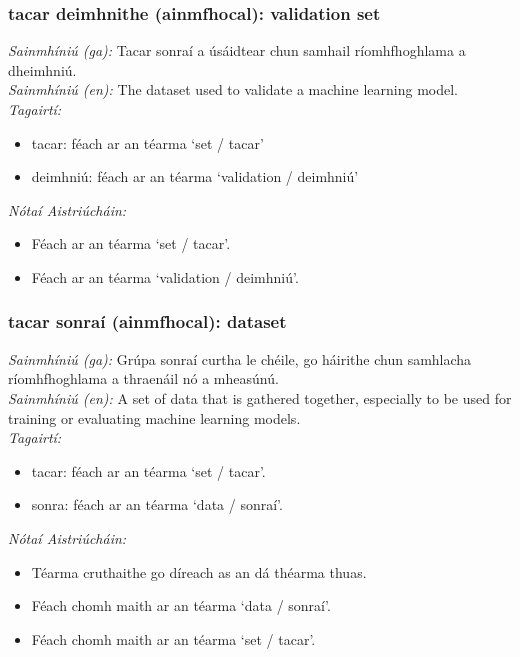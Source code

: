 \subsubsection*{tacar deimhnithe (ainmfhocal): validation set}
 \noindent \textit{Sainmhíniú (ga):} Tacar sonraí a úsáidtear chun samhail ríomhfhoghlama a dheimhniú.
\\
 \noindent \textit{Sainmhíniú (en):} The dataset used to validate a machine learning model.
\\
 \noindent \textit{Tagairtí:}
\begin{itemize}
	\item tacar: féach ar an téarma `set / tacar'
	\item deimhniú: féach ar an téarma `validation / deimhniú'
\end{itemize}

 \noindent \textit{Nótaí Aistriúcháin:}
\begin{itemize}
	\item Féach ar an téarma `set / tacar'.
	\item Féach ar an téarma `validation / deimhniú'.
\end{itemize}


\subsubsection*{tacar sonraí (ainmfhocal): dataset}
 \noindent \textit{Sainmhíniú (ga):} Grúpa sonraí curtha le chéile, go háirithe chun samhlacha ríomhfhoghlama a thraenáil nó a mheasúnú.
\\
 \noindent \textit{Sainmhíniú (en):} A set of data that is gathered together, especially to be used for training or evaluating machine learning models.
\\
 \noindent \textit{Tagairtí:}
\begin{itemize}
	\item tacar: féach ar an téarma `set / tacar'.
	\item sonra: féach ar an téarma `data / sonraí'.
\end{itemize}

 \noindent \textit{Nótaí Aistriúcháin:}
\begin{itemize}
	\item Téarma cruthaithe go díreach as an dá théarma thuas.
	\item Féach chomh maith ar an téarma `data / sonraí'.
	\item Féach chomh maith ar an téarma `set / tacar'.
\end{itemize}


